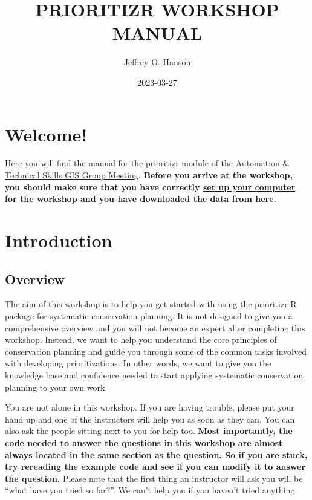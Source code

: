 \documentclass[
  12pt,
]{book}
\title{PRIORITIZR WORKSHOP MANUAL}
\author{Jeffrey O. Hanson}
\date{2023-03-27}
\begin{document}
\maketitle

{
\hypersetup{linkcolor=}
\setcounter{tocdepth}{0}
\tableofcontents
}
\hypertarget{welcome}{%
\chapter{Welcome!}\label{welcome}}

Here you will find the manual for the prioritizr module of the \href{https://prioritizr.github.io/NCC-workshop/}{Automation \& Technical Skills GIS Group Meeting}. \textbf{Before you arrive at the workshop, you should make sure that you have correctly \protect\hyperlink{setup}{set up your computer for the workshop} and you have \href{https://github.com/prioritizr/NCC-workshop/raw/main/data.zip}{downloaded the data from here}.}

\hypertarget{introduction}{%
\chapter{Introduction}\label{introduction}}

\hypertarget{overview}{%
\section{Overview}\label{overview}}

The aim of this workshop is to help you get started with using the prioritizr R package for systematic conservation planning. It is not designed to give you a comprehensive overview and you will not become an expert after completing this workshop. Instead, we want to help you understand the core principles of conservation planning and guide you through some of the common tasks involved with developing prioritizations. In other words, we want to give you the knowledge base and confidence needed to start applying systematic conservation planning to your own work.

You are not alone in this workshop. If you are having trouble, please put your hand up and one of the instructors will help you as soon as they can. You can also ask the people sitting next to you for help too. \textbf{Most importantly, the code needed to answer the questions in this workshop are almost always located in the same section as the question. So if you are stuck, try rereading the example code and see if you can modify it to answer the question.} Please note that the first thing an instructor will ask you will be ``what have you tried so far?''. We can't help you if you haven't tried anything.
\end{document}
